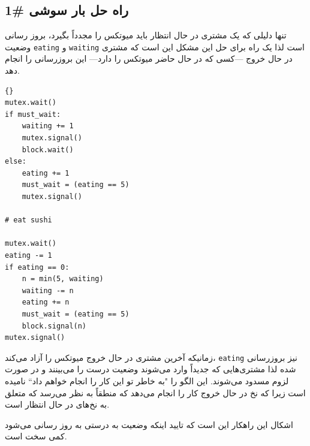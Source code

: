 \documentclass{book}
\newcommand{\clearemptydoublepage}{\newpage\cleardoublepage}
\begin{document}
\clearemptydoublepage
\subsection{راه حل بار سوشی  \#1}

    تنها دلیلی که یک مشتری در حال انتظار باید میوتکس را مجدداً بگیرد، بروز رسانی وضعیت  {\tt eating} و {\tt waiting} است لذا 
    یک راه برای حل این مشکل این است که مشتری  در حال خروج ---کسی که در حال حاضر میوتکس را دارد--- این بروزرسانی را انجام دهد. 

\begin{latin}
\begin{lstlisting}[title=\rl{راه حل بار سوشی  \#1}]{}
mutex.wait()
if must_wait:
    waiting += 1
    mutex.signal()
    block.wait()
else:
    eating += 1
    must_wait = (eating == 5)
    mutex.signal()

# eat sushi

mutex.wait()
eating -= 1
if eating == 0:
    n = min(5, waiting)
    waiting -= n
    eating += n
    must_wait = (eating == 5)
    block.signal(n)
mutex.signal()
\end{lstlisting}
\end{latin}

    زمانیکه آخرین مشتری در حال خروج میوتکس را آزاد می‌کند، {\tt eating} نیز بروزرسانی شده لذا مشتری‌هایی که جدیداً وارد می‌شوند وضعیت درست 
    را می‌بینند و در صورت لزوم مسدود می‌شوند.  این الگو را ‍‍"به خاطر تو این کار را انجام خواهم داد`` نامیده است زیرا که نخ در حال خروج 
    کار را انجام می‌دهد که منطقاً به نظر می‌رسد که متعلق به نخ‌های در حال انتظار است. 

    اشکال این راهکار این است که تایید اینکه وضعیت به درستی به روز رسانی می‌شود کمی سخت است. 
\end{document}

